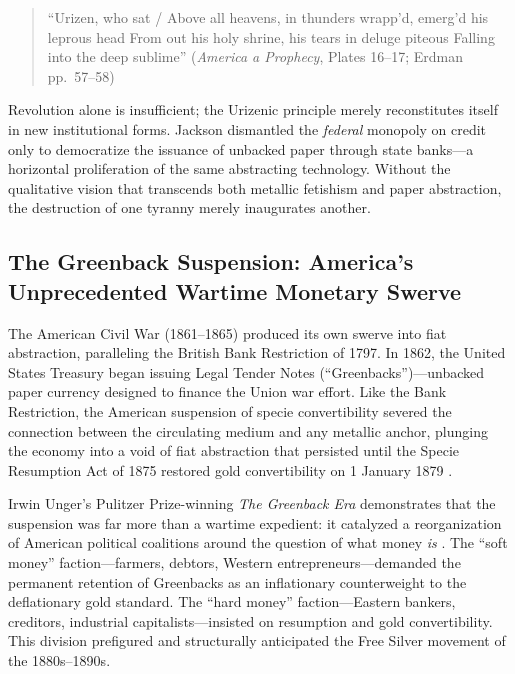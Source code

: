 \documentclass[
]{article}
\begin{document}
\begin{quote}
``Urizen, who sat / Above all heavens, in thunders wrapp'd, emerg'd his
leprous head From out his holy shrine, his tears in deluge piteous
Falling into the deep sublime'' (\emph{America a Prophecy}, Plates
16--17; Erdman pp.~57--58) \citep{erdman1988complete, blake1793america}
\end{quote}

Revolution alone is insufficient; the Urizenic principle merely
reconstitutes itself in new institutional forms. Jackson dismantled the
\emph{federal} monopoly on credit only to democratize the issuance of
unbacked paper through state banks---a horizontal proliferation of the
same abstracting technology. Without the qualitative vision that
transcends both metallic fetishism and paper abstraction, the
destruction of one tyranny merely inaugurates another.

\subsection{The Greenback Suspension: America's Unprecedented Wartime
Monetary
Swerve}\label{the-greenback-suspension-americas-unprecedented-wartime-monetary-swerve}

The American Civil War (1861--1865) produced its own swerve into fiat
abstraction, paralleling the British Bank Restriction of 1797. In 1862,
the United States Treasury began issuing Legal Tender Notes
(``Greenbacks'')---unbacked paper currency designed to finance the Union
war effort. Like the Bank Restriction, the American suspension of specie
convertibility severed the connection between the circulating medium and
any metallic anchor, plunging the economy into a void of fiat
abstraction that persisted until the Specie Resumption Act of 1875
restored gold convertibility on 1 January 1879
\citep{laughlin1898bimetallism, unger1964greenback}.

Irwin Unger's Pulitzer Prize-winning \emph{The Greenback Era}
demonstrates that the suspension was far more than a wartime expedient:
it catalyzed a reorganization of American political coalitions around
the question of what money \emph{is} \citep{unger1964greenback}. The
``soft money'' faction---farmers, debtors, Western
entrepreneurs---demanded the permanent retention of Greenbacks as an
inflationary counterweight to the deflationary gold standard. The ``hard
money'' faction---Eastern bankers, creditors, industrial
capitalists---insisted on resumption and gold convertibility. This
division prefigured and structurally anticipated the Free Silver
movement of the 1880s--1890s.
\end{document}
